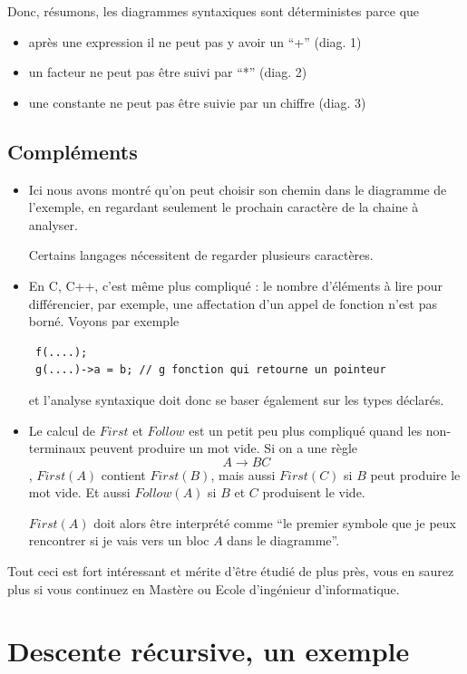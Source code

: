 {Donc, résumons, les diagrammes syntaxiques sont déterministes parce que
\begin{itemize}
\item après une expression il ne peut pas y avoir un ``+'' (diag. 1)
\item un facteur ne peut pas être suivi par ``*'' (diag. 2)
\item une constante ne peut pas être suivie par un chiffre (diag. 3)
\end{itemize}

\subsection{Compléments}

\begin{itemize}
\item Ici nous avons montré qu'on peut choisir son chemin 
dans le diagramme de l'exemple, en regardant seulement le prochain
caractère de la chaine à analyser.

Certains langages nécessitent de regarder plusieurs caractères. 

\item En C, C++,
c'est même plus compliqué : le nombre d'éléments à lire pour différencier,
par exemple, une affectation d'un appel de fonction n'est pas borné. 
Voyons par exemple 
\begin{verbatim}
 f(....);
 g(....)->a = b; // g fonction qui retourne un pointeur
\end{verbatim}
et l'analyse syntaxique doit donc se baser également sur les types
déclarés.

\item Le calcul de $First$ et $Follow$  est un petit peu plus compliqué
quand les non-terminaux peuvent produire un mot vide. Si on a une règle
$$A \rightarrow B C $$, $First(A)$ contient $First(B)$, mais aussi
$First(C)$ si $B$ peut produire le mot vide. Et aussi $Follow(A)$ si
$B$ et $C$ produisent le vide.

$First(A)$ doit alors être interprété comme ``le premier symbole que
je peux rencontrer si je vais vers un bloc $A$ dans le diagramme''.
\end{itemize}

Tout ceci est fort intéressant et mérite d'être étudié de plus près,
vous en saurez plus si vous continuez en Mastère ou Ecole d'ingénieur
d'informatique.

\section{Descente récursive, un exemple}

}
